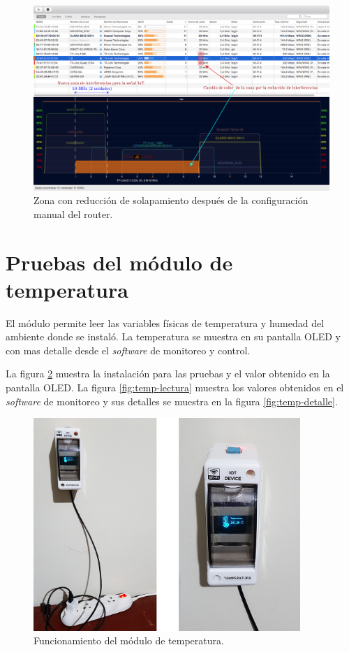 
\begin{landscape} %
\begin{figure}[htpb]
\centering 
\includegraphics[width=1.5\textwidth]{./Figures/wifi/06.png}
\caption{Zona con reducción de solapamiento después de la configuración manual del router.}
\label{fig:test06}
\end{figure}
\end{landscape} %


\section{Pruebas del módulo de temperatura}

El módulo permite leer las variables físicas de temperatura y humedad del ambiente donde se instaló. La temperatura se muestra en su pantalla OLED y con mas detalle desde el \emph{software} de monitoreo y control.

La figura \ref{fig:test-temp} muestra la instalación para las pruebas y el valor obtenido en la pantalla OLED. La figura \ref{fig:temp-lectura} muestra los valores obtenidos en el \emph{software} de monitoreo y sus detalles se muestra en la figura \ref{fig:temp-detalle}.

\begin{figure}[htpb]
\centering 
\includegraphics[width=0.9\textwidth]{./Figures/test/temp/test-temp.png}
\caption{Funcionamiento del módulo de temperatura.}
\label{fig:test-temp}
\end{figure}


